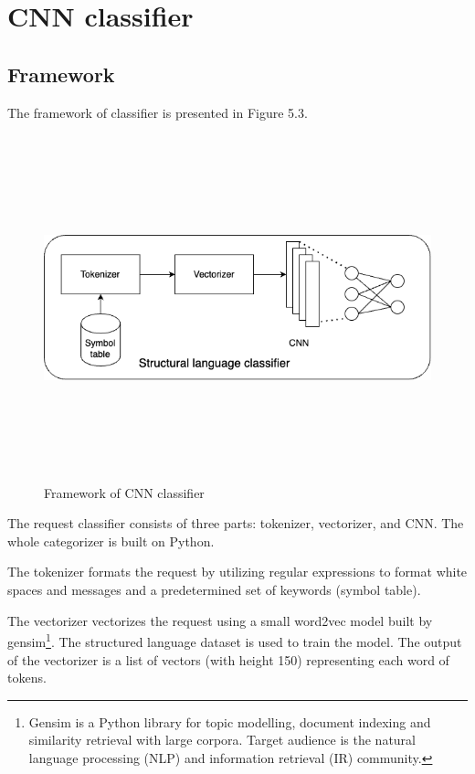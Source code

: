 \section{CNN classifier}
\label{sec:cnn_classfier}

\subsection{Framework}
\hspace{0.5cm}The framework of classifier is presented in Figure 5.3.
\begin{figure}[ht]
	\centering
	\includegraphics[width=\linewidth, height=10cm,keepaspectratio]{figures/structural.png}
  \caption{Framework of CNN classifier}
\end{figure} 
The request classifier consists of three parts: tokenizer, vectorizer, and CNN. The whole categorizer is built on Python.

The tokenizer formats the request by utilizing regular expressions to format white spaces and messages and a predetermined set of keywords (symbol table).

The vectorizer vectorizes the request using a small word2vec model built by gensim\footnote{Gensim is a Python library for topic modelling, document indexing and similarity retrieval with large corpora. Target audience is the natural language processing (NLP) and information retrieval (IR) community.}. The structured language dataset is used to train the model. The output of the vectorizer is a list of vectors (with height 150) representing each word of tokens.

